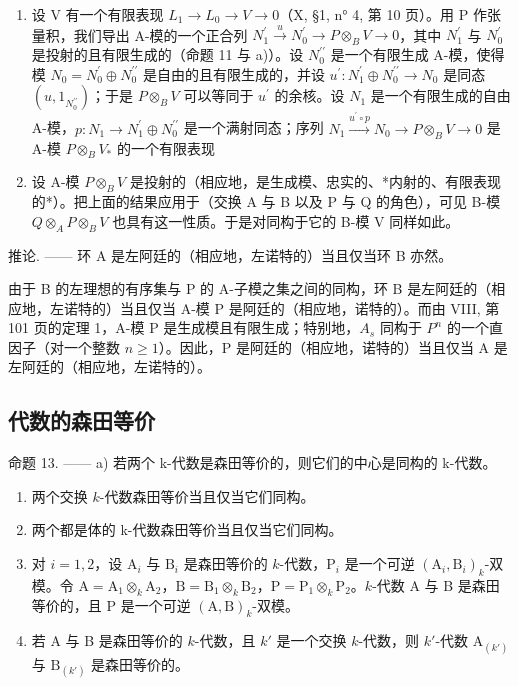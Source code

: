 \begin{enumerate}
\def\labelenumi{\alph{enumi})}
\setcounter{enumi}{4}
\item
  设 V 有一个有限表现 \(L_{1} \to L_{0} \to V \to 0\)（X, §1, n° 4, 第 10 页）。用 P 作张量积，我们导出 A-模的一个正合列 \(N_{1}^{\prime} \xrightarrow{u} N_{0}^{\prime} \to P \otimes_{B} V \to 0\)，其中 \(N_{1}^{\prime}\) 与 \(N_{0}^{\prime}\) 是投射的且有限生成的（命题 11 与 a)）。设 \(N_{0}^{\prime\prime}\) 是一个有限生成 A-模，使得模 \(N_{0} = N_{0}^{\prime} \oplus N_{0}^{\prime\prime}\) 是自由的且有限生成的，并设 \(u^{\prime}: N_{1}^{\prime} \oplus N_{0}^{\prime\prime} \to N_{0}\) 是同态 \((u, 1_{N_{0}^{\prime\prime}})\)；于是 \(P \otimes_{B} V\) 可以等同于 \(u^{\prime}\) 的余核。设 \(N_{1}\) 是一个有限生成的自由 A-模，\(p: N_{1} \to N_{1}^{\prime} \oplus N_{0}^{\prime\prime}\) 是一个满射同态；序列 \(N_{1} \xrightarrow{u^{\prime} \circ p} N_{0} \to P \otimes_{B} V \to 0\) 是 A-模 \(P \otimes_{B} V_*\) 的一个有限表现
\item
  设 A-模 \(P \otimes_{B} V\) 是投射的（相应地，是生成模、忠实的、*内射的、有限表现的*）。把上面的结果应用于（交换 A 与 B 以及 P 与 Q 的角色），可见 B-模 \(Q \otimes_{A} P \otimes_{B} V\) 也具有这一性质。于是对同构于它的 B-模 V 同样如此。
\end{enumerate}

推论. —— 环 A 是左阿廷的（相应地，左诺特的）当且仅当环 B 亦然。

由于 B 的左理想的有序集与 P 的 A-子模之集之间的同构，环 B 是左阿廷的（相应地，左诺特的）当且仅当 A-模 P 是阿廷的（相应地，诺特的）。而由 VIII, 第 101 页的定理 1，A-模 P 是生成模且有限生成；特别地，\(A_{s}\) 同构于 \(P^{n}\) 的一个直因子（对一个整数 \(n \geqslant 1\)）。因此，P 是阿廷的（相应地，诺特的）当且仅当 A 是左阿廷的（相应地，左诺特的）。

\subsection{代数的森田等价}

命题 13. —— a) 若两个 k-代数是森田等价的，则它们的中心是同构的 k-代数。

\begin{enumerate}
\def\labelenumi{\alph{enumi})}
\setcounter{enumi}{1}
\item
  两个交换 \(k\)-代数森田等价当且仅当它们同构。
\item
  两个都是体的 k-代数森田等价当且仅当它们同构。
\item
  对 \(i = 1,2\)，设 \(\mathrm{A}_i\) 与 \(\mathrm{B}_i\) 是森田等价的 \(k\)-代数，\(\mathrm{P}_i\) 是一个可逆 \((\mathrm{A}_i,\mathrm{B}_i)_k\)-双模。令 \(\mathrm{A} = \mathrm{A}_1\otimes_k\mathrm{A}_2\)，\(\mathrm{B} = \mathrm{B}_1\otimes_k\mathrm{B}_2\)，\(\mathrm{P} = \mathrm{P}_1 \otimes_k \mathrm{P}_2\)。\(k\)-代数 A 与 B 是森田等价的，且 P 是一个可逆 \((\mathrm{A}, \mathrm{B})_k\)-双模。
\item
  若 A 与 B 是森田等价的 \(k\)-代数，且 \(k'\) 是一个交换 \(k\)-代数，则 \(k'\)-代数 \(\mathrm{A}_{(k')}\) 与 \(\mathrm{B}_{(k')}\) 是森田等价的。
\end{enumerate}

